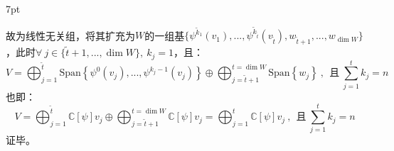 \documentclass[zihao=5,UTF8]{report}
\theoremstyle{mystyle} %
\newenvironment{graybox}{%
\def\FrameCommand{%
\hspace{1pt}%
{\color{gray}\small \vrule width 2pt}%
{\color{graybox_color}\vrule width 4pt}%
\colorbox{graybox_color}%
}%
\MakeFramed{\advance\hsize-\width\FrameRestore}%
\noindent\hspace{-4.55pt}%
\begin{adjustwidth}{}{7pt}%
\vspace{2pt}\vspace{2pt}%
}
{%
\vspace{2pt}\end{adjustwidth}\endMakeFramed%
}
\begin{document}
\begin{graybox}
故为线性无关组，将其扩充为$W$的一组基$\{\psi^{\tilde{k}_1}(v_1),...,\psi^{\tilde{k}_{\tilde{t}}}(v_{\tilde{t}}), w_{\tilde{t}+1},...,w_{\dim W}\}$，此时$\forall \ j \in \{\tilde{t}+1,...,\dim W\},\ k_j = 1$，且：
\begin{equation*}
V =  \bigoplus_{j =1}^{\tilde{t}} \text{Span}\left\{ \psi^0(v_j),...,\psi^{k_j-1}(v_j)\right\}\oplus \bigoplus_{j =\tilde{t}+1}^{t = \dim W} \text{Span}\left\{ w_j\right\} \ ,\ \ \text{且}\ \sum_{j=1}^{t}k_j= n
\end{equation*}
也即：
\begin{equation*}
    V =  \bigoplus_{j =1}^{\tilde{t}}\mathbb{C}[\psi]v_j \oplus \bigoplus_{j =\tilde{t}+1}^{t = \dim W} \mathbb{C}[\psi]v_j = \bigoplus_{j =1}^{t}\mathbb{C}[\psi]v_j \ ,\ \ \text{且}\ \sum_{j=1}^{t}k_j= n
\end{equation*}
证毕。
\end{graybox}
\end{document}
